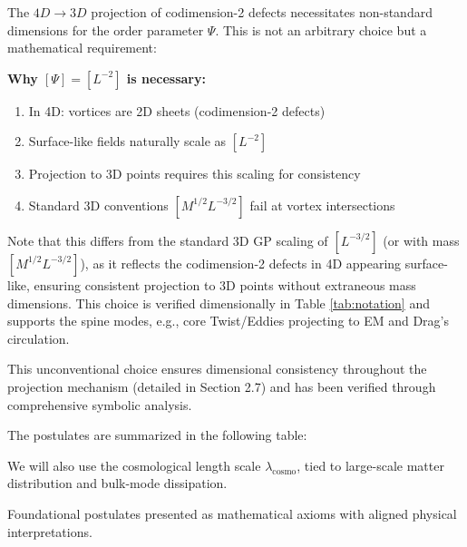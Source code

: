 The $4D\to3D$ projection of codimension-2 defects necessitates non-standard dimensions for the order parameter $\Psi$. This is not an arbitrary choice but a mathematical requirement:

\textbf{Why $[\Psi] = [L^{-2}]$ is necessary:}
\begin{enumerate}
\item In 4D: vortices are 2D sheets (codimension-2 defects)
\item Surface-like fields naturally scale as $[L^{-2}]$
\item Projection to 3D points requires this scaling for consistency
\item Standard 3D conventions $[M^{1/2} L^{-3/2}]$ fail at vortex intersections
\end{enumerate}

Note that this differs from the standard 3D GP scaling of $[L^{-3/2}]$ (or with mass $[M^{1/2} L^{-3/2}]$), as it reflects the codimension-2 defects in 4D appearing surface-like, ensuring consistent projection to 3D points without extraneous mass dimensions. This choice is verified dimensionally in Table \ref{tab:notation} and supports the spine modes, e.g., core Twist/Eddies projecting to EM and Drag's circulation.

This unconventional choice ensures dimensional consistency throughout the projection mechanism (detailed in Section 2.7) and has been verified through comprehensive symbolic analysis.

\medskip

The postulates are summarized in the following table:

We will also use the cosmological length scale $\lambda_{\text{cosmo}}$, tied to large-scale matter distribution and bulk-mode dissipation.

\begin{center}
\begin{minipage}{\textwidth}
\captionsetup{type=table,name=Postulates}
\caption{Foundational postulates presented as mathematical axioms with aligned physical interpretations.}
\label{tab:postulates}
\end{minipage}
\end{center}

\medskip

